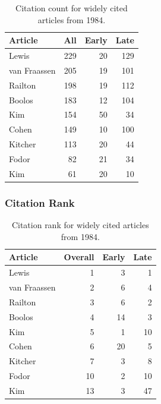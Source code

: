 \documentclass[
  10pt,
  letterpaper,
  DIV=11,
  numbers=noendperiod,
  twoside]{scrartcl}
\begin{document}
\begin{longtable}[]{@{}lrrr@{}}

\caption{\label{tbl-citation-count-1984}Citation count for widely cited
articles from 1984.}

\tabularnewline

\toprule\noalign{}
Article & All & Early & Late \\
\midrule\noalign{}
\endhead
\bottomrule\noalign{}
\endlastfoot
Lewis & 229 & 20 & 129 \\
van Fraassen & 205 & 19 & 101 \\
Railton & 198 & 19 & 112 \\
Boolos & 183 & 12 & 104 \\
Kim & 154 & 50 & 34 \\
Cohen & 149 & 10 & 100 \\
Kitcher & 113 & 20 & 44 \\
Fodor & 82 & 21 & 34 \\
Kim & 61 & 20 & 10 \\

\end{longtable}

\subsubsection*{Citation Rank}\label{sec-rank-1984}

\begin{longtable}[]{@{}lrrr@{}}

\caption{\label{tbl-citation-rank-1984}Citation rank for widely cited
articles from 1984.}

\tabularnewline

\toprule\noalign{}
Article & Overall & Early & Late \\
\midrule\noalign{}
\endhead
\bottomrule\noalign{}
\endlastfoot
Lewis & 1 & 3 & 1 \\
van Fraassen & 2 & 6 & 4 \\
Railton & 3 & 6 & 2 \\
Boolos & 4 & 14 & 3 \\
Kim & 5 & 1 & 10 \\
Cohen & 6 & 20 & 5 \\
Kitcher & 7 & 3 & 8 \\
Fodor & 10 & 2 & 10 \\
Kim & 13 & 3 & 47 \\

\end{longtable}
\end{document}
